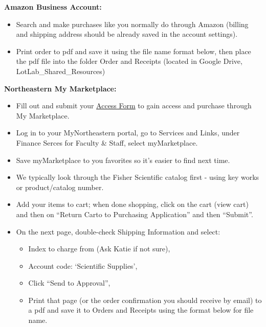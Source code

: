 \documentclass[
  letterpaper,
  DIV=11,
  numbers=noendperiod]{scrreprt}
\begin{document}

\textbf{Amazon Business Account:}

\begin{itemize}
\item
  Search and make purchases like you normally do through Amazon (billing
  and shipping address should be already saved in the account settings).
\item
  Print order to pdf and save it using the file name format below, then
  place the pdf file into the folder Order and Receipts (located in
  Google Drive, LotLab\_Shared\_Resources)
\end{itemize}

\textbf{Northeastern My Marketplace:}

\begin{itemize}
\item
  Fill out and submit your
  \href{https://github.com/thais-neu/Thais_lab_protocols/files/7541425/myMarketplace-Access-Form.pdf}{Access
  Form} to gain access and purchase through My Marketplace.
\item
  Log in to your MyNortheastern portal, go to Services and Links, under
  Finance Serces for Faculty \& Staff, select myMarketplace.
\item
  Save myMarketplace to you favorites so it's easier to find next time.
\item
  We typically look through the Fisher Scientific catalog first - using
  key works or product/catalog number.
\item
  Add your items to cart; when done shopping, click on the cart (view
  cart) and then on ``Return Carto to Purchasing Application'' and then
  ``Submit''.
\item
  On the next page, double-check Shipping Information and select:

  \begin{itemize}
  \item
    Index to charge from (Ask Katie if not sure),
  \item
    Account code: `Scientific Supplies',
  \item
    Click ``Send to Approval'',
  \item
    Print that page (or the order confirmation you should receive by
    email) to a pdf and save it to Orders and Receipts using the format
    below for file name.
  \end{itemize}
\end{itemize}
\end{document}
